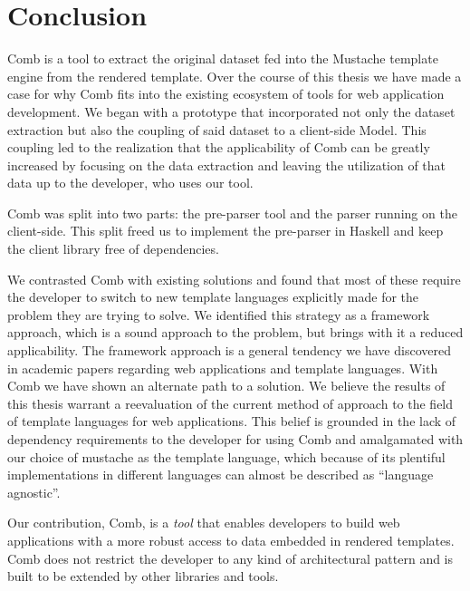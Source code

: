 \documentclass[thesis.tex]{subfiles}
\begin{document}
\chapter{Conclusion}
\label{chap:conclusion}
Comb is a tool to extract the original dataset fed into the Mustache template
engine from the rendered template.
Over the course of this thesis we have made a case for why Comb fits into the
existing ecosystem of tools for web application development.
We began with a prototype that incorporated not only the dataset extraction but
also the coupling of said dataset to a client-side Model.
This coupling led to the realization that the applicability of Comb can be
greatly increased by focusing on the data extraction and leaving the utilization
of that data up to the developer, who uses our tool.

Comb was split into two parts: the pre-parser tool and the parser running on
the client-side. This split freed us to implement the pre-parser in Haskell
and keep the client library free of dependencies.


We contrasted Comb with existing solutions and found that most of these require
the developer to switch to new template languages explicitly made for the
problem they are trying to solve. We identified this strategy as a framework
approach, which is a sound approach to the problem, but brings with it a reduced
applicability.
The framework approach is a general tendency we have discovered in
academic papers regarding web applications and template languages.
With Comb we have shown an alternate path to a solution.
We believe the results of this thesis warrant a reevaluation of the
current method of approach to the field of template languages for
web applications.
This belief is grounded in the lack of dependency requirements to the developer
for using Comb and amalgamated with our choice of mustache as the template
language, which because of its plentiful implementations in different languages
can almost be described as ``language agnostic''.



Our contribution, Comb, is a \emph{tool} that enables developers to
build web applications with a more robust access to data embedded in rendered
templates. Comb does not restrict the developer to any kind of architectural
pattern and is built to be extended by other libraries and tools.
\end{document}
